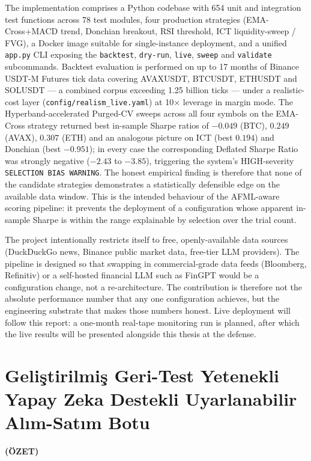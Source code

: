\documentclass[a4paper, 12pt, titlepage]{article}
\newcommand{\theturkishtitle}{Geliştirilmiş Geri-Test Yetenekli Yapay Zeka Destekli Uyarlanabilir Alım-Satım Botu}
\begin{document}
The implementation comprises a Python codebase with 654 unit and
integration test functions across 78 test modules, four production
strategies (EMA-Cross+MACD trend, Donchian breakout, RSI threshold,
ICT liquidity-sweep / FVG), a Docker image suitable for single-instance
deployment, and a unified \texttt{app.py} CLI exposing the
\texttt{backtest}, \texttt{dry-run}, \texttt{live}, \texttt{sweep} and
\texttt{validate} subcommands. Backtest evaluation is performed on up
to 17 months of Binance USDT-M Futures tick data covering AVAXUSDT,
BTCUSDT, ETHUSDT and SOLUSDT --- a combined corpus exceeding 1.25
billion ticks --- under a realistic-cost layer
(\texttt{config/realism\_live.yaml}) at 10$\times$ leverage in margin
mode. The Hyperband-accelerated Purged-CV sweeps across all four
symbols on the EMA-Cross strategy returned best in-sample Sharpe
ratios of $-0.049$ (BTC), $0.249$ (AVAX), $0.307$ (ETH) and an
analogous picture on ICT (best $0.194$) and Donchian (best $-0.951$);
in every case the corresponding Deflated Sharpe Ratio was strongly
negative ($-2.43$ to $-3.85$), triggering the system's HIGH-severity
\texttt{SELECTION BIAS WARNING}. The honest empirical finding is
therefore that none of the candidate strategies demonstrates a
statistically defensible edge on the available data window. This is
the intended behaviour of the AFML-aware scoring pipeline: it prevents
the deployment of a configuration whose apparent in-sample Sharpe is
within the range explainable by selection over the trial count.

The project intentionally restricts itself to free, openly-available
data sources (DuckDuckGo news, Binance public market data, free-tier
LLM providers). The pipeline is designed so that swapping in
commercial-grade data feeds (Bloomberg, Refinitiv) or a self-hosted
financial LLM such as FinGPT would be a configuration change, not a
re-architecture. The contribution is therefore not the absolute
performance number that any one configuration achieves, but the
engineering substrate that makes those numbers honest. Live
deployment will follow this report: a one-month real-tape monitoring
run is planned, after which the live results will be presented
alongside this thesis at the defense.

\newpage
\section*{\centering\theturkishtitle}
\centerline{\fontsize{16pt}{21.6pt}\sffamily\bfseries (ÖZET)}
\end{document}
